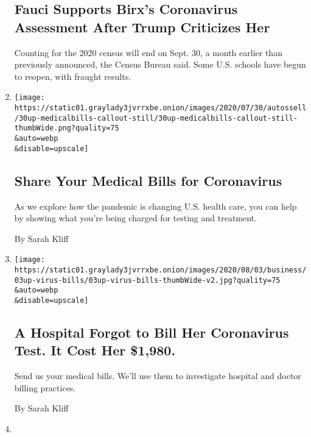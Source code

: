 \begin{enumerate}
{  \subsection{Fauci Supports Birx's Coronavirus Assessment After Trump
  Criticizes
  Her}\label{fauci-supports-birxs-coronavirus-assessment-after-trump-criticizes-her}}

  Counting for the 2020 census will end on Sept. 30, a month earlier
  than previously announced, the Census Bureau said. Some U.S. schools
  have begun to reopen, with fraught results.
\item
  \href{/2020/08/03/reader-center/coronavirus-medical-bills.html}{}

  \texttt{[image: https://static01.graylady3jvrrxbe.onion/images/2020/07/30/autossell/30up-medicalbills-callout-still/30up-medicalbills-callout-still-thumbWide.png?quality=75\\\&auto=webp\\\&disable=upscale]}

  \hypertarget{share-your-medical-bills-for-coronavirus}{%
  \subsection{Share Your Medical Bills for
  Coronavirus}\label{share-your-medical-bills-for-coronavirus}}

  As we explore how the pandemic is changing U.S. health care, you can
  help by showing what you're being charged for testing and treatment.

  By Sarah Kliff
\item
  \href{/2020/08/03/upshot/nj-coronavirus-medical-bill.html}{}

  \texttt{[image: https://static01.graylady3jvrrxbe.onion/images/2020/08/03/business/03up-virus-bills/03up-virus-bills-thumbWide-v2.jpg?quality=75\\\&auto=webp\\\&disable=upscale]}

  \hypertarget{a-hospital-forgot-to-bill-her-coronavirus-test-it-cost-her-1980-1}{%
  \subsection{A Hospital Forgot to Bill Her Coronavirus Test. It Cost
  Her
  \$1,980.}\label{a-hospital-forgot-to-bill-her-coronavirus-test-it-cost-her-1980-1}}

  Send us your medical bills. We'll use them to investigate hospital and
  doctor billing practices.

  By Sarah Kliff
\item
  \href{/2020/08/03/reader-center/healthcare-workers-coronavirus-care.html}{}


\end{enumerate}
